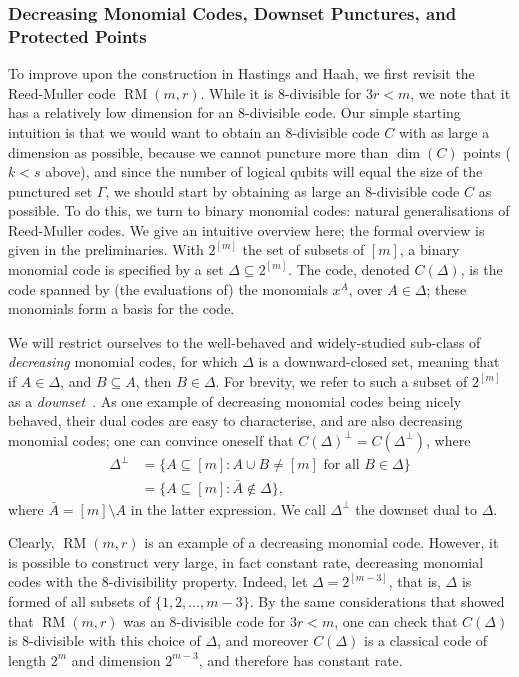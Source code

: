 \documentclass{article}
\DeclareMathOperator{\RM}{RM}
\begin{document}
\subsubsection{Decreasing Monomial Codes, Downset Punctures, and Protected Points}\label{subsubsec:discussion_decreasing_monomial_downset}

To improve upon the construction in Hastings and Haah, we first revisit the Reed-Muller code $\RM(m,r)$. While it is $8$-divisible for $3r<m$, we note that it has a relatively low dimension for an $8$-divisible code. Our simple starting intuition is that we would want to obtain an $8$-divisible code $C$ with as large a dimension as possible, because we cannot puncture more than $\dim(C)$ points ($k < s$ above), and since the number of logical qubits will equal the size of the punctured set $\Gamma$, we should start by obtaining as large an $8$-divisible code $C$ as possible. To do this, we turn to binary monomial codes: natural generalisations of Reed-Muller codes. We give an intuitive overview here; the formal overview is given in the preliminaries. With $2^{[m]}$ the set of subsets of $[m]$, a binary monomial code is specified by a set $\Delta \subseteq 2^{[m]}$. The code, denoted $C(\Delta)$, is the code spanned by (the evaluations of) the monomials $x^A$, over $A \in \Delta$; these monomials form a basis for the code. 

We will restrict ourselves to the well-behaved and widely-studied sub-class of \textit{decreasing} monomial codes, for which $\Delta$ is a downward-closed set, meaning that if $A \in \Delta$, and $B \subseteq A$, then $B \in \Delta$. For brevity, we refer to such a subset of $2^{[m]}$ as a \textit{downset}~\cite{srinivasan2019decoding}. As one example of decreasing monomial codes being nicely behaved, their dual codes are easy to characterise, and are also decreasing monomial codes; one can convince oneself that $C(\Delta)^\perp = C(\Delta^\perp)$, where
\begin{align}
    \Delta^\perp &= \{A \subseteq [m]: A \cup B \neq [m] \text{ for all } B \in \Delta\}\\
    &= \{A \subseteq [m]: \bar{A} \notin \Delta\},\label{eq:dual_downset_expos}
\end{align}
where $\bar{A} = [m]\setminus A$ in the latter expression. We call $\Delta^\perp$ the downset dual to $\Delta$.


Clearly, $\RM(m,r)$ is an example of a decreasing monomial code. However, it is possible to construct very large, in fact constant rate, decreasing monomial codes with the $8$-divisibility property. Indeed, let $\Delta = 2^{[m-3]}$, that is, $\Delta$ is formed of all subsets of $\{1, 2, \ldots, m-3\}$. By the same considerations that showed that $\RM(m,r)$ was an $8$-divisible code for $3r<m$, one can check that $C(\Delta)$ is $8$-divisible with this choice of $\Delta$, and moreover $C(\Delta)$ is a classical code of length $2^m$ and dimension $2^{m-3}$, and therefore has constant rate.
\end{document}
